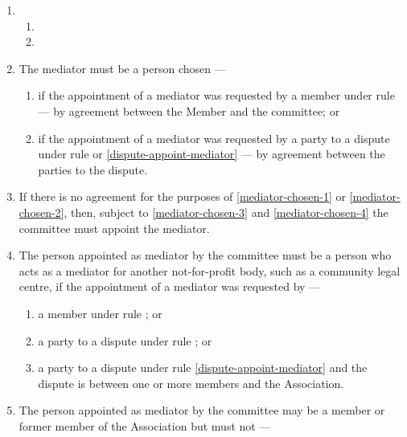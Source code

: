 \documentclass[../constitution.tex]{subfiles}
\begin{document}
\begin{enumerate}

\item {}

  \begin{enumerate}
  
  \item {}
  \item {}
  \end{enumerate}
\item The mediator must be a person chosen ---

  \begin{enumerate}
  
  \item if the appointment of a mediator was requested by a member under rule \chreplaced[id=proofing]{\ref{expulsion-appoint-mediator}}{\ref{expulsion-written-notice}} --- by agreement between the Member and the committee; or \label{mediator-chosen-1}
  \item if the appointment of a mediator was requested by a party to a dispute under rule  or \ref{dispute-appoint-mediator} --- by agreement between the parties to the dispute. \label{mediator-chosen-2}
  \end{enumerate}
\item If there is no agreement for the purposes of  \ref{mediator-chosen-1} or \ref{mediator-chosen-2}, then, subject to  \ref{mediator-chosen-3} and \ref{mediator-chosen-4} the committee must appoint the mediator.
\item The person appointed as mediator by the committee must be a person who acts as a mediator for another not-for-profit body, such as a community legal centre, if the appointment of a mediator was requested by --- \label{mediator-chosen-3}

  \begin{enumerate}
  
  \item a member under rule \chreplaced[id=proofing]{\ref{expulsion-appoint-mediator}}{\ref{expulsion-written-notice}}; or
  \item a party to a dispute under rule ; or
  \item a party to a dispute under rule \ref{dispute-appoint-mediator} and the dispute is between one or more members and the Association.
  \end{enumerate}
\item The person appointed as mediator by the committee may be a member or former member of the Association but must not --- \label{mediator-chosen-4}


\end{enumerate}
\end{document}
